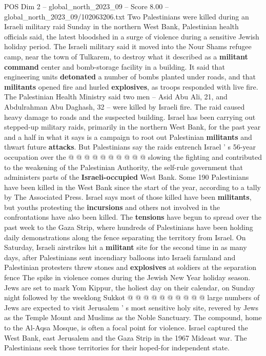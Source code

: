 \begin{textsample}{POS Dim 2 – global\_north\_2023\_09 – Score 8.00 – global\_north\_2023\_09/102063206.txt}  \label{ex:f2_pos_138}
Two Palestinians were killed during an Israeli military raid Sunday in the northern West Bank, Palestinian health officials said, the latest bloodshed in a surge of violence during a sensitive Jewish holiday period.
The Israeli military said it moved into the Nour Shams refugee camp, near the town of Tulkarem, to destroy what it described as a \textbf{militant} \textbf{command} center and bomb-storage facility in a building.
It said that engineering units \textbf{detonated} a number of bombs planted under roads, and that \textbf{militants} opened fire and hurled \textbf{explosives}, as troops responded with live fire.
The Palestinian Health Ministry said two men -- Asid Abu Ali, 21, and Abdulrahman Abu Daghash, 32 -- were killed by Israeli fire.
The raid caused heavy damage to roads and the suspected building.
Israel has been carrying out stepped-up military raids, primarily in the northern West Bank, for the past year and a half in what it says is a campaign to root out Palestinian \textbf{militants} and thwart future \textbf{attacks}.
But Palestinians say the raids entrench Israel ' s 56-year occupation over the @ @ @ @ @ @ @ @ @ @ slowing the fighting and contributed to the weakening of the Palestinian Authority, the self-rule government that administers parts of the \textbf{Israeli-occupied} West Bank.
Some 190 Palestinians have been killed in the West Bank since the start of the year, according to a tally by The Associated Press.
Israel says most of those killed have been \textbf{militants}, but youths protesting the \textbf{incursions} and others not involved in the confrontations have also been killed.
The \textbf{tensions} have begun to spread over the past week to the Gaza Strip, where hundreds of Palestinians have been holding daily demonstrations along the fence separating the territory from Israel.
On Saturday, Israeli airstrikes hit a \textbf{militant} site for the second time in as many days, after Palestinians sent incendiary balloons into Israeli farmland and Palestinian protesters threw stones and \textbf{explosives} at soldiers at the separation fence The spike in violence comes during the Jewish New Year holiday season.
Jews are set to mark Yom Kippur, the holiest day on their calendar, on Sunday night followed by the weeklong Sukkot @ @ @ @ @ @ @ @ @ @ large numbers of Jews are expected to visit Jerusalem ' s most sensitive holy site, revered by Jews as the Temple Mount and Muslims as the Noble Sanctuary.
The compound, home to the Al-Aqsa Mosque, is often a focal point for violence.
Israel captured the West Bank, east Jerusalem and the Gaza Strip in the 1967 Mideast war.
The Palestinians seek those territories for their hoped-for independent state.

\end{textsample}
